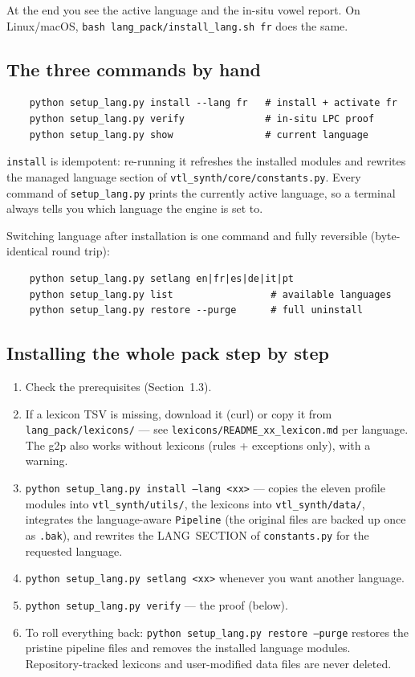 \documentclass[11pt,a4paper]{article}
\newcommand{\code}[1]{\texttt{#1}}
\begin{document}
At the end you see the active language and the in-situ vowel report.
On Linux/macOS, \code{bash lang\_pack/install\_lang.sh fr} does the
same.

\subsection{The three commands by hand}

\begin{verbatim}
    python setup_lang.py install --lang fr   # install + activate fr
    python setup_lang.py verify              # in-situ LPC proof
    python setup_lang.py show                # current language
\end{verbatim}

\code{install} is idempotent: re-running it refreshes the installed
modules and rewrites the managed language section of
\code{vtl\_synth/core/constants.py}. Every command of
\code{setup\_lang.py} prints the currently active language, so a
terminal always tells you which language the engine is set to.

Switching language after installation is one command and fully
reversible (byte-identical round trip):

\begin{verbatim}
    python setup_lang.py setlang en|fr|es|de|it|pt
    python setup_lang.py list                 # available languages
    python setup_lang.py restore --purge      # full uninstall
\end{verbatim}

\subsection{Installing the whole pack step by step}

\begin{enumerate}
\item Check the prerequisites (Section~1.3).
\item If a lexicon TSV is missing, download it (curl) or copy it from
      \code{lang\_pack/lexicons/} --- see
      \code{lexicons/README\_xx\_lexicon.md} per language. The g2p
      also works without lexicons (rules + exceptions only), with a
      warning.
\item \code{python setup\_lang.py install --lang <xx>}
      --- copies the eleven profile modules into
      \code{vtl\_synth/utils/}, the lexicons into
      \code{vtl\_synth/data/}, integrates the language-aware
      \code{Pipeline} (the original files are backed up once as
      \code{.bak}), and rewrites the LANG~SECTION of
      \code{constants.py} for the requested language.
\item \code{python setup\_lang.py setlang <xx>} whenever you want
      another language.
\item \code{python setup\_lang.py verify} --- the proof (below).
\item To roll everything back:
      \code{python setup\_lang.py restore --purge} restores the
      pristine pipeline files and removes the installed language
      modules. Repository-tracked lexicons and user-modified data
      files are never deleted.
\end{enumerate}
\end{document}
